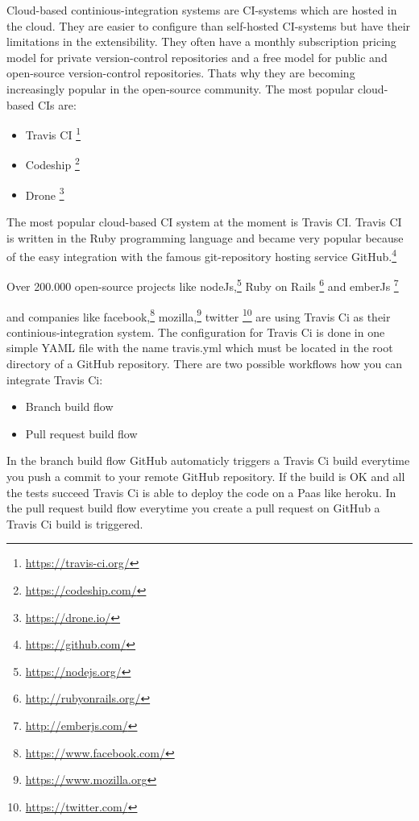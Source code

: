 Cloud-based continious-integration systems are CI-systems which are hosted in the cloud.
They are easier to configure than self-hosted CI-systems but have their limitations in the extensibility.
They often have a monthly subscription pricing model for private version-control repositories 
and a free model for public and open-source version-control repositories.
Thats why they are becoming increasingly popular in the open-source community.
The most popular cloud-based CIs are:
\begin{itemize} 
    \item Travis CI \footnote{\url{https://travis-ci.org/}}

    \item Codeship \footnote{\url{https://codeship.com/}}

    \item Drone \footnote{\url{https://drone.io/}}

\end{itemize}
The most popular cloud-based CI system at the moment is Travis CI.
Travis CI is written in the Ruby programming language and became very popular because of the easy integration with the famous git-repository hosting service GitHub.\footnote{\url{https://github.com/}}

Over 200.000 open-source projects like nodeJs,\footnote{\url{https://nodejs.org/}}
 Ruby on Rails \footnote{\url{http://rubyonrails.org/}}
and emberJs \footnote{\url{http://emberjs.com/}}

and companies like facebook,\footnote{\url{https://www.facebook.com/}}
 mozilla,\footnote{\url{https://www.mozilla.org}}
 twitter \footnote{\url{https://twitter.com/}}
are using Travis Ci as their continious-integration system.
The configuration for Travis Ci is done in one simple YAML file with the name travis.yml 
which must be located in the root directory of a GitHub repository.
There are two possible workflows how you can integrate Travis Ci:
\begin{itemize} 
    \item Branch build flow
    \item Pull request build flow
\end{itemize}
In the branch build flow GitHub automaticly triggers a Travis Ci build everytime you push a commit to your remote GitHub repository.
If the build is OK and all the tests succeed Travis Ci is able to deploy the code on a Paas like heroku.
In the pull request build flow everytime you create a pull request on GitHub a Travis Ci build is triggered.

